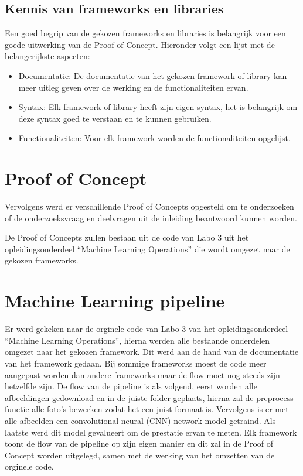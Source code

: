 \subsection{Kennis van frameworks en libraries}
Een goed begrip van de gekozen frameworks en libraries is belangrijk voor een goede uitwerking van de Proof of Concept. Hieronder volgt een lijst met de belangerijkste aspecten:
\begin{itemize}
  \item Documentatie: De documentatie van het gekozen framework of library kan meer uitleg geven over de werking en de functionaliteiten ervan.
  \item Syntax: Elk framework of library heeft zijn eigen syntax, het is belangrijk om deze syntax goed te verstaan en te kunnen gebruiken.
  \item Functionaliteiten: Voor elk framework worden de functionaliteiten opgelijst.
\end{itemize}
\section{Proof of Concept}
Vervolgens werd er verschillende Proof of Concepts opgesteld om te onderzoeken of de onderzoeksvraag en deelvragen uit de inleiding beantwoord kunnen worden.

De Proof of Concepts zullen bestaan uit de code van Labo 3 uit het opleidingsonderdeel ``Machine Learning Operations'' die wordt omgezet naar de gekozen frameworks.
\section{Machine Learning pipeline}
Er werd gekeken naar de orginele code van Labo 3 van het opleidingsonderdeel ``Machine Learning Operations'', hierna werden alle bestaande onderdelen omgezet naar het gekozen framework. Dit werd aan de hand van de documentatie van het framework gedaan.
Bij sommige frameworks moest de code meer aangepast worden dan andere frameworks maar de flow moet nog steeds zijn hetzelfde zijn.
De flow van de pipeline is als volgend, eerst worden alle afbeeldingen gedownload en in de juiste folder geplaats, hierna zal de preprocess functie alle foto's bewerken zodat het een juist formaat is. Vervolgens is er met alle afbeelden een convolutional neural (CNN) network model getraind. Als laatste werd dit model gevalueert om de prestatie ervan te meten.
Elk framework toont de flow van de pipeline op zijn eigen manier en dit zal in de Proof of Concept worden uitgelegd, samen met de werking van het omzetten van de orginele code.
